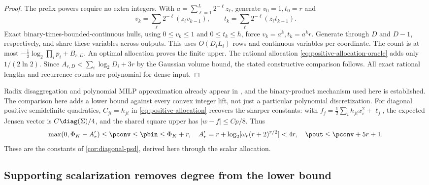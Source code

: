 \begin{proof}
The prefix powers require no extra integers. With
$a=\sum_{\ell=1}^L2^{-\ell}z_\ell$, generate $v_0=1,t_0=r$ and
\begin{equation}\label{eq:exact-prefix-powers}
 v_k=\sum_\ell2^{-\ell}(z_\ell v_{k-1}),\qquad
 t_k=\sum_\ell2^{-\ell}(z_\ell t_{k-1}).
\end{equation}
Exact binary-times-bounded-continuous hulls, using $0\le v_k\le1$
and $0\le t_k\le h$, force $v_k=a^k,t_k=a^kr$. Generate through
$D$ and $D-1$, respectively, and share these variables across outputs.
This uses $O(D_iL_i)$ rows and continuous variables per coordinate.
The count is at most $-\frac12\log_2\prod_ip_i+B_{r,D}$.
An optimal allocation proves the finite upper. The rational allocation
\eqref{eq:positive-allocation-oracle} adds only $1/(2\ln2)$.
Since $A_{r,D}<\sum_i\log_2D_i+3r$ by the Gaussian volume bound,
the stated constructive comparison follows. All exact rational lengths
and recurrence counts are polynomial for dense input.
\end{proof}

Radix disaggregation and polynomial MILP approximation already appear in
\citet{teles2013}, and the binary-product mechanism used here is
established. The comparison here adds a lower bound against every
convex integer lift, not just a particular polynomial discretization.
For diagonal positive semidefinite quadratics, $C_{ji}=h_{ji}$ in
\eqref{eq:positive-allocation} recovers the sharper constants:
with $f_j=\frac12\sum_ih_{ji}x_i^2+\ell_j$, the expected Jensen vector is
$C\diag(\Sigma)/4$, and the shared square upper has
$|w-f|\le Cp/8$. Thus
\begin{equation}\label{eq:unconditional-diagonal-sharp}
 \max(0,\Phi_K-A_r')\le\pconv\le\pbin\le\Phi_K+r,
 \quad A_r'=r+\log_2[\omega_r(r+2)^{r/2}]<4r,
 \quad \pout\le\pconv+5r+1.
\end{equation}
These are the constants of \cref{cor:diagonal-psd}, derived here through
the scalar allocation.

\subsection{Supporting scalarization removes degree from the lower bound}

